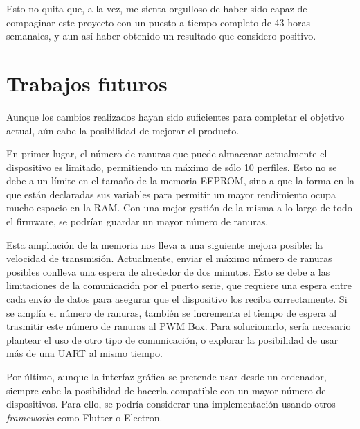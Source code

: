 Esto no quita que, a la vez, me sienta orgulloso de haber sido capaz de compaginar este proyecto con un puesto a tiempo completo de 43 horas semanales, y aun así haber obtenido un resultado que considero positivo.

\section{Trabajos futuros}

Aunque los cambios realizados hayan sido suficientes para completar el objetivo actual, aún cabe la posibilidad de mejorar el producto.

En primer lugar, el número de ranuras que puede almacenar actualmente el dispositivo es limitado, permitiendo un máximo de sólo 10 perfiles. Esto no se debe a un límite en el tamaño de la memoria EEPROM, sino a que la forma en la que están declaradas sus variables para permitir un mayor rendimiento ocupa mucho espacio en la RAM. Con una mejor gestión de la misma a lo largo de todo el firmware, se podrían guardar un mayor número de ranuras.

Esta ampliación de la memoria nos lleva a una siguiente mejora posible: la velocidad de transmisión. Actualmente, enviar el máximo número de ranuras posibles conlleva una espera de alrededor de dos minutos. Esto se debe a las limitaciones de la comunicación por el puerto serie, que requiere una espera entre cada envío de datos para asegurar que el dispositivo los reciba correctamente. Si se amplía el número de ranuras, también se incrementa el tiempo de espera al trasmitir este número de ranuras al PWM Box. Para solucionarlo, sería necesario plantear el uso de otro tipo de comunicación, o explorar la posibilidad de usar más de una UART al mismo tiempo.

Por último, aunque la interfaz gráfica se pretende usar desde un ordenador, siempre cabe la posibilidad de hacerla compatible con un mayor número de dispositivos. Para ello, se podría considerar una implementación usando otros \textit{frameworks} como Flutter o Electron.

